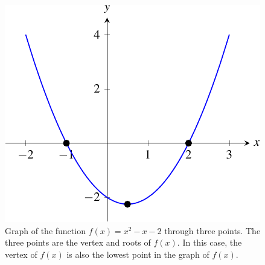 \documentclass[a4paper,oneside,12pt]{article}
\begin{document}
\begin{figure}[!htbp]
\centering
\includegraphics[scale=1]{image/07/a1-bminus1-cminus2.pdf}
\caption{%
  Graph of the function $f(x) = x^2 - x - 2$ through three points.
  The three points are the vertex and roots of $f(x)$.  In this case,
  the vertex of $f(x)$ is also the lowest point in the graph of
  $f(x)$.
}
\label{fig:a1_bminus1_cminus2}
\end{figure}
\end{document}

